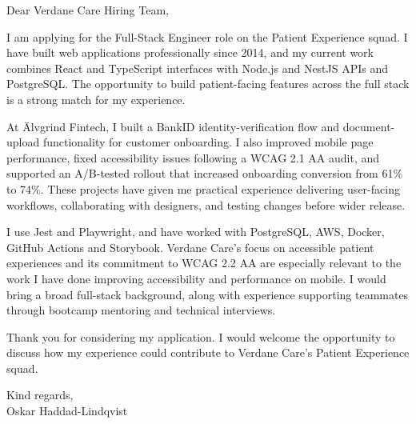 \documentclass[11pt,a4paper]{article}
\begin{document}
Dear Verdane Care Hiring Team,

I am applying for the Full-Stack Engineer role on the Patient Experience squad. I have built web applications professionally since 2014, and my current work combines React and TypeScript interfaces with Node.js and NestJS APIs and PostgreSQL. The opportunity to build patient-facing features across the full stack is a strong match for my experience.

At Älvgrind Fintech, I built a BankID identity-verification flow and document-upload functionality for customer onboarding. I also improved mobile page performance, fixed accessibility issues following a WCAG 2.1 AA audit, and supported an A/B-tested rollout that increased onboarding conversion from 61\% to 74\%. These projects have given me practical experience delivering user-facing workflows, collaborating with designers, and testing changes before wider release.

I use Jest and Playwright, and have worked with PostgreSQL, AWS, Docker, GitHub Actions and Storybook. Verdane Care’s focus on accessible patient experiences and its commitment to WCAG 2.2 AA are especially relevant to the work I have done improving accessibility and performance on mobile. I would bring a broad full-stack background, along with experience supporting teammates through bootcamp mentoring and technical interviews.

Thank you for considering my application. I would welcome the opportunity to discuss how my experience could contribute to Verdane Care’s Patient Experience squad.

Kind regards,\\
Oskar Haddad-Lindqvist
\end{document}
